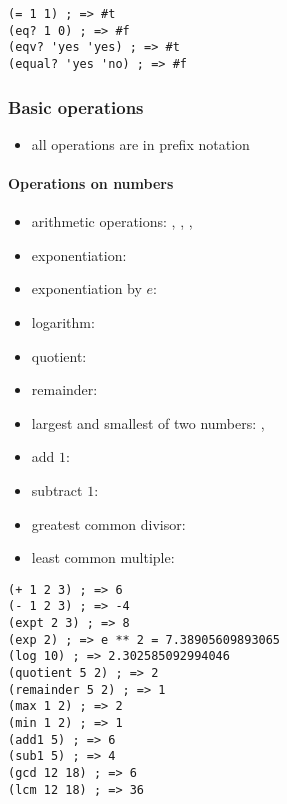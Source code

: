 \documentclass[a4paper,landscape,10pt]{article}
\begin{document}
\begin{multicols*}{2}
  \begin{lstlisting}[language=Racket]
(= 1 1) ; => #t
(eq? 1 0) ; => #f
(eqv? 'yes 'yes) ; => #t
(equal? 'yes 'no) ; => #f
\end{lstlisting}

  \subsubsection{Basic operations}

  \begin{itemize}
    \item all operations are in prefix notation 
  \end{itemize}

  \breakcolumn

  \paragraph{Operations on numbers}

  \begin{itemize}
    \item arithmetic operations: \iracket{+}, \iracket{-}, \iracket{*}, \iracket{/}
    \item exponentiation: 
    \item exponentiation by \(e\): 
    \item logarithm: 
    \item quotient: 
    \item remainder: 
    \item largest and smallest of two numbers: , 
    \item add \(1\): 
    \item subtract \(1\): 
    \item greatest common divisor: 
    \item least common multiple: 
  \end{itemize}

  \begin{lstlisting}[language=Racket]
(+ 1 2 3) ; => 6
(- 1 2 3) ; => -4
(expt 2 3) ; => 8
(exp 2) ; => e ** 2 = 7.38905609893065
(log 10) ; => 2.302585092994046
(quotient 5 2) ; => 2
(remainder 5 2) ; => 1
(max 1 2) ; => 2
(min 1 2) ; => 1
(add1 5) ; => 6
(sub1 5) ; => 4
(gcd 12 18) ; => 6
(lcm 12 18) ; => 36
\end{lstlisting}


\end{multicols*}
\end{document}

